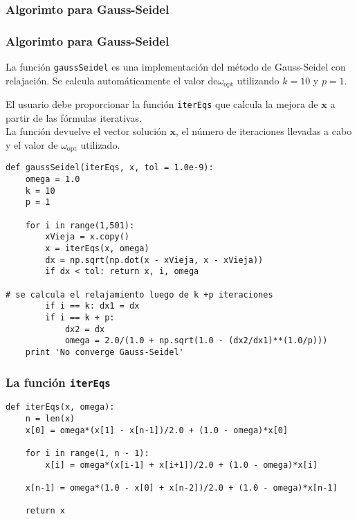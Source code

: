 \subsubsection{Algorimto para Gauss-Seidel}
\begin{frame}
\frametitle{Algorimto para Gauss-Seidel}
La función \texttt{gaussSeidel} es una implementación del método de Gauss-Seidel con relajación. Se calcula automáticamente el valor de$\omega_{\mbox{opt}}$ utilizando $k = 10$ y $p = 1$.
\end{frame}
\begin{frame}
El usuario debe proporcionar la función \texttt{iterEqs} que calcula la mejora de $\mathbf{x}$ a partir de las fórmulas iterativas.
\\
\bigskip
La función devuelve el vector solución $\mathbf{x}$, el número de iteraciones llevadas a cabo y el valor de $\omega_{\mbox{opt}}$ utilizado.
\end{frame}
\begin{frame}[fragile]
\begin{lstlisting}[basicstyle=\linespread{0.9}\ttfamily\small, columns=fullflexible]
def gaussSeidel(iterEqs, x, tol = 1.0e-9):
    omega = 1.0
    k = 10
    p = 1
    
    for i in range(1,501):
        xVieja = x.copy()
        x = iterEqs(x, omega)
        dx = np.sqrt(np.dot(x - xVieja, x - xVieja))
        if dx < tol: return x, i, omega
        
# se calcula el relajamiento luego de k +p iteraciones
        if i == k: dx1 = dx
        if i == k + p:
            dx2 = dx
            omega = 2.0/(1.0 + np.sqrt(1.0 - (dx2/dx1)**(1.0/p)))
	print 'No converge Gauss-Seidel'
\end{lstlisting} 
\end{frame}
\begin{frame}[fragile]
\frametitle{La función \texttt{iterEqs}}
\begin{lstlisting}[basicstyle=\linespread{0.9}\ttfamily\small, columns=fullflexible]
def iterEqs(x, omega):
    n = len(x)
    x[0] = omega*(x[1] - x[n-1])/2.0 + (1.0 - omega)*x[0]
    
    for i in range(1, n - 1):
        x[i] = omega*(x[i-1] + x[i+1])/2.0 + (1.0 - omega)*x[i]
    
    x[n-1] = omega*(1.0 - x[0] + x[n-2])/2.0 + (1.0 - omega)*x[n-1]

    return x
\end{lstlisting}
\end{frame}
